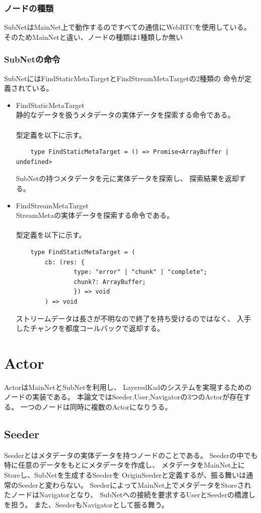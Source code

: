 \documentclass[sotsuron]{jcsie}
\begin{document}
\subsubsection{ノードの種類}
SubNetはMainNet上で動作するのですべての通信にWebRTCを使用している。
そのためMainNetと違い、ノードの種類は1種類しか無い

\subsubsection{SubNetの命令}
SubNetにはFindStaticMetaTargetとFindStreamMetaTargetの2種類の
命令が定義されている。
\begin{itemize}
	\item {FindStaticMetaTarget}\\
	静的なデータを扱うメタデータの実体データを探索する命令である。
	\\\\
	型定義を以下に示す。
	\begin{lstlisting}
	type FindStaticMetaTarget = () => Promise<ArrayBuffer | undefined>
	\end{lstlisting}
	SubNetの持つメタデータを元に実体データを探索し、
	探索結果を返却する。
	\\
	\item {FindStreamMetaTarget}\\
	StreamMetaの実体データを探索する命令である。
	\\\\
	型定義を以下に示す。
	\begin{lstlisting}
	type FindStaticMetaTarget = (
		cb: (res: {
				type: "error" | "chunk" | "complete";
				chunk?: ArrayBuffer;
				}) => void
		) => void
	\end{lstlisting}
	ストリームデータは長さが不明なので終了を持ち受けるのではなく、
	入手したチャンクを都度コールバックで返却する。
\end{itemize}

\section{Actor}
ActorはMainNetとSubNetを利用し、
LayeredKadのシステムを実現するためのノードの実装である。
本論文ではSeeder,User,Navigatorの3つのActorが存在する。
一つのノードは同時に複数のActorになりうる。

\subsection{Seeder}
Seederとはメタデータの実体データを持つノードのことである。
Seederの中でも特に任意のデータをもとにメタデータを作成し、
メタデータをMainNet上にStoreし、SubNetを生成するSeederを
OriginSeederと定義するが、振る舞いは通常のSeederと変わらない。
SeederによってMainNet上でメタデータをStoreされたノードはNavigatorとなり、
SubNetへの接続を要求するUserとSeederの橋渡しを担う。
また、SeederもNavigatorとして振る舞う。
\end{document}

